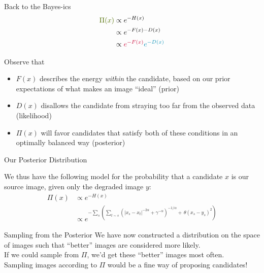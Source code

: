 \documentclass[10pt]{beamer}
\begin{document}
\begin{frame}{Back to the Bayes-ics}
\begin{align*}
{\color{posterior}\Pi(x)} &\propto e^{-H(x)}
\\ &\propto e^{-F(x) - D(x)}
\\ &\propto {\color{prior}e^{-F(x)}} {\color{likelihood}e^{-D(x)}}
\end{align*}

Observe that 
\begin{itemize}
\item {\color{prior}$F(x)$} describes the energy \textit{within} the candidate, based on our prior expectations of what makes an image ``ideal'' ({\color{prior}prior})
\item {\color{likelihood}$D(x)$} disallows the candidate from straying too far from the observed data ({\color{likelihood}likelihood})
\item {\color{posterior}$\Pi(x)$} will favor candidates that satisfy both of these conditions in an optimally balanced way ({\color{posterior}posterior})
\end{itemize}

\end{frame}

\begin{frame}{Our Posterior Distribution}
\begin{block}{}
We thus have the following model for the probability that a candidate $x$ is our source image, given only the degraded image $y$:
\pause
\begin{align*}
\Pi(x) &\propto e^{-H(x)}
\\ &\propto e^{-\sum\limits_{s} \left(\sum\limits_{t \sim s} \left(|x_s-x_t|^{-2\alpha} + \gamma^{-\alpha}\right)^{-1/\alpha} +\, \theta(x_s-y_s)^2\right)}
\end{align*}
\end{block}
\end{frame}

\begin{frame}{Sampling from the Posterior}
We have now constructed a distribution on the space of images such that ``better'' images are considered more likely.
\\[2ex]
If we could sample from $\Pi$, we'd get these ``better'' images most often.
\\[2ex]
Sampling images according to $\Pi$ would be a fine way of proposing candidates!

\end{frame}
\end{document}

